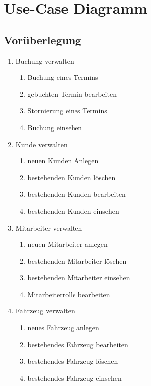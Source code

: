 \chapter{Use-Case Diagramm}

\section{Vorüberlegung}

\begin{enumerate}[itemsep= 0 cm]
    \item Buchung verwalten
    \begin{enumerate}[itemsep= -0.25 cm]
        \item Buchung eines Termins
        \item gebuchten Termin bearbeiten
        \item Stornierung eines Termins
        \item Buchung einsehen
    \end{enumerate}
    \item Kunde verwalten
    \begin{enumerate}[itemsep= -0.25 cm]
        \item neuen Kunden Anlegen
        \item bestehenden Kunden löschen
        \item bestehenden Kunden bearbeiten
        \item bestehenden Kunden einsehen
    \end{enumerate}
    \item Mitarbeiter verwalten
    \begin{enumerate}[itemsep= -0.25 cm]
        \item neuen Mitarbeiter anlegen
        \item bestehenden Mitarbeiter löschen
        \item bestehenden Mitarbeiter einsehen
        \item Mitarbeiterrolle bearbeiten
    \end{enumerate}
    \item Fahrzeug verwalten
    \begin{enumerate}[itemsep= -0.25 cm]
        \item neues Fahrzeug anlegen 
        \item bestehendes Fahrzeug bearbeiten
        \item bestehendes Fahrzeug löschen
        \item bestehendes Fahrzeug einsehen

\end{enumerate}
\end{enumerate}
